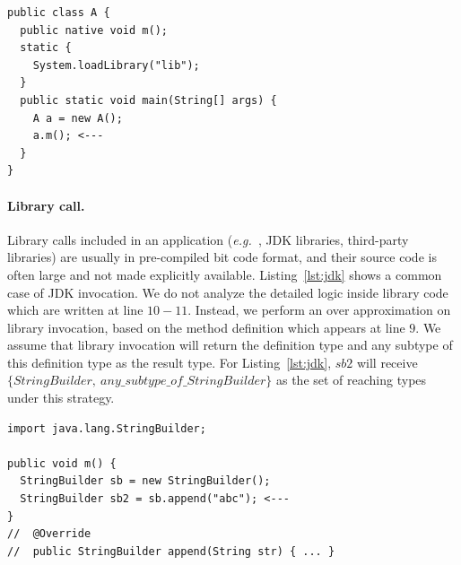 \documentclass{fac}
\newcommand\eg{\textit{e.g.\ }}
\begin{document}
\begin{lstlisting}[caption={Example code for JNI},label={lst:jni}]
public class A {
  public native void m();
  static {
    System.loadLibrary("lib");
  }
  public static void main(String[] args) {
    A a = new A();
    a.m(); <---
  }
}
\end{lstlisting}


\paragraph{Library call.} Library calls included in an application (\eg, JDK libraries, third-party libraries) are usually in pre-compiled bit code format, and their source code is often large and not made explicitly available. Listing~\ref{lst:jdk} shows a common case of JDK invocation. We do not analyze the detailed logic inside library code which are written at line $10-11$. Instead, we perform an over approximation on library invocation, based on the method definition which appears at line $9$. We assume that library invocation will return the definition type and any subtype of this definition type as the result type. For Listing~\ref{lst:jdk}, $sb2$ will receive $\{StringBuilder,\ any\_subtype\_of\_StringBuilder\}$ as the set of reaching types under this strategy.

\begin{lstlisting}[caption={Example code for JDK library calls},label={lst:jdk}]
import java.lang.StringBuilder;

public void m() {
  StringBuilder sb = new StringBuilder();
  StringBuilder sb2 = sb.append("abc"); <---
}
//  @Override
//  public StringBuilder append(String str) { ... }
\end{lstlisting}

\end{document}
